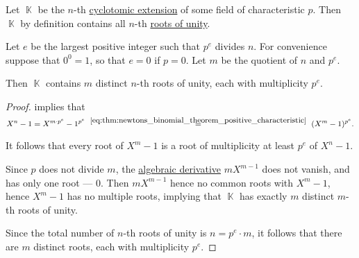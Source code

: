 \begin{lemma}\label{thm:roots_of_unity_multiplicity}
  Let \( \BbbK \) be the \( n \)-th \hyperref[def:cyclotomic_extension]{cyclotomic extension} of some field of characteristic \( p \). Then \( \BbbK \) by definition contains all \( n \)-th \hyperref[def:root_of_unity]{roots of unity}.

  Let \( e \) be the largest positive integer such that \( p^e \) divides \( n \). For convenience suppose that \( 0^0 = 1 \), so that \( e = 0 \) if \( p = 0 \). Let \( m \) be the quotient of \( n \) and \( p^e \).

  Then \( \BbbK \) contains \( m \) distinct \( n \)-th roots of unity, each with multiplicity \( p^e \).
\end{lemma}
\begin{proof}
   implies that
  \begin{equation}\label{eq:thm:roots_of_unity_multiplicity/proof}
    X^n - 1
    =
    X^{m \cdot p^e} - 1^{p^e}
    \reloset {\eqref{eq:thm:newtons_binomial_theorem_positive_characteristic}} =
    (X^m - 1)^{p^e}.
  \end{equation}

  It follows that every root of \( X^m - 1 \) is a root of multiplicity at least \( p^e \) of \( X^n - 1 \).

  Since \( p \) does not divide \( m \), the \hyperref[def:algebraic_derivative]{algebraic derivative} \( m X^{m - 1} \) does not vanish, and has only one root --- \( 0 \). Then \( m X^{m-1} \) hence no common roots with \( X^m - 1 \), hence \( X^m - 1 \) has no multiple roots, implying that \( \BbbK \) has exactly \( m \) distinct \( m \)-th roots of unity.

  Since the total number of \( n \)-th roots of unity is \( n = p^e \cdot m \), it follows that there are \( m \) distinct roots, each with multiplicity \( p^e \).
\end{proof}

